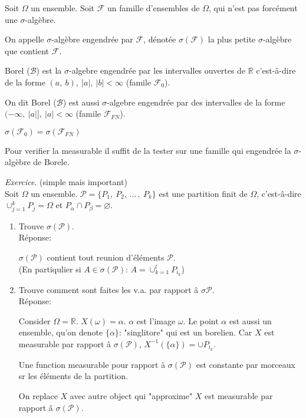 Soit $\Omega$ un ensemble. Soit $\mathcal{F}$ un famille d'ensembles de $\Omega$, qui n'est pas forcément une $\sigma$-algèbre.

\begin{definition}
	On appelle $\sigma$-algèbre engendrée par $\mathcal{F}$, dénotée $\sigma(\mathcal{F})$ la plus petite $\sigma$-algèbre que contient $\mathcal{F}$.
\end{definition}

\begin{definition}
	Borel ($\mathcal{B}$) est la $\sigma$-algebre engendrée par les intervalles ouvertes de $\mathbb{R}$ c'est-â-dire de la forme $(a,\ b),\ |a|,\ |b| < \infty$ (famile $\mathcal{F}_0$).
\end{definition}

On dit Borel ($\mathcal{B}$) est aussi $\sigma$-algebre engendrée par des intervalles de la forme $(-\infty,\ |a|],\ |a|<\infty$ (famile $\mathcal{F}_{FN}$).

\begin{remark}
	$\sigma(\mathcal{F}_0)=\sigma(\mathcal{F}_{FN})$
\end{remark}

\begin{proposition}
	Pour verifier la measurable il suffit de la tester sur une famille qui engendrée la $\sigma$-algèbre de Borele.
\end{proposition}

\emph{Exercice}. (simple mais important)\\
Soit $\Omega$ un ensemble. $\mathcal{P}= \{P_1,\ P_2,\,...\,,\ P_k\}$ est une partition finit de $\Omega$, c'est-â-dire $\cup_{j=1}^k P_j=\Omega$ et $P_\alpha\cap P_\beta=\varnothing$.

\begin{enumerate}
	\item Trouve $\sigma(\mathcal{P})$.\\Réponse:
	
$\sigma(\mathcal{P})$ contient tout reunion d'éléments $\mathcal{P}$.\\
(En partiqulier si $A\in\sigma(\mathcal{P})$: $A=\cup_{k=1}^l P_{i_k}$)
	\item Trouve comment sont faites les v.a. par rapport â $\sigma{\mathcal{P}}$.\\Réponse:
	
	Consider $\Omega=\mathbb{R}$. $X(\omega)=\alpha$. $\alpha$ est l'image $\omega$. Le point  $\alpha$ est aussi un ensemble, qu'on denote $\{\alpha\}$: "singlitore" qui est un borelien. Car $X$ est measurable par rapport â $\sigma(\mathcal{P})$, $X^{-1}(\{\alpha\})=\cup P_{i_k}$.
	
	Une function measurable pour rapport à $\sigma(\mathcal{P})$ est constante par morceaux sr les éléments de la partition. 
	
	On replace $X$ avec autre object qui "approxime" $X$ est measurable par rapport â $\sigma(\mathcal{P})$.
\end{enumerate}

